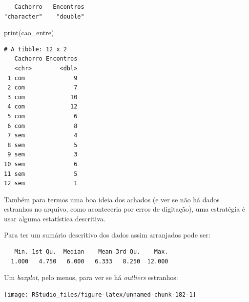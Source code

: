\documentclass[
]{article}
\newenvironment{Shaded}{\begin{snugshade}}{\end{snugshade}}
\newcommand{\FunctionTok}[1]{\textcolor[rgb]{0.00,0.00,0.00}{#1}}
\newcommand{\NormalTok}[1]{#1}
\newcommand{\OtherTok}[1]{\textcolor[rgb]{0.56,0.35,0.01}{#1}}
\newcommand{\SpecialCharTok}[1]{\textcolor[rgb]{0.00,0.00,0.00}{#1}}
\begin{document}
\begin{verbatim}
   Cachorro   Encontros 
"character"    "double" 
\end{verbatim}

\begin{Shaded}
\begin{Highlighting}[]
\FunctionTok{print}\NormalTok{(cao\_entre)}
\end{Highlighting}
\end{Shaded}

\begin{verbatim}
# A tibble: 12 x 2
   Cachorro Encontros
   <chr>        <dbl>
 1 com              9
 2 com              7
 3 com             10
 4 com             12
 5 com              6
 6 com              8
 7 sem              4
 8 sem              5
 9 sem              3
10 sem              6
11 sem              5
12 sem              1
\end{verbatim}

Também para termos uma boa ideia dos achados (e ver se não há dados
estranhos no arquivo, como aconteceria por erros de digitação), uma
estratégia é usar alguma estatística descritiva.

Para ter um sumário descritivo dos dados assim arranjados pode ser:

\begin{Shaded}
\end{Shaded}

\begin{verbatim}
   Min. 1st Qu.  Median    Mean 3rd Qu.    Max. 
  1.000   4.750   6.000   6.333   8.250  12.000 
\end{verbatim}

Um \emph{boxplot}, pelo menos, para ver se há \emph{outliers} estranhos:

\begin{Shaded}
\end{Shaded}

\begin{center}\texttt{[image: RStudio\_files/figure-latex/unnamed-chunk-182-1]} \end{center}
\end{document}
